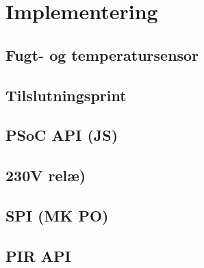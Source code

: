 \chapter{Implementering}


\section{Fugt- og temperatursensor}


\section{Tilslutningsprint}


\section{PSoC API (JS)}


\section{230V relæ)}


\section{SPI (MK PO)}


\section{PIR API}




